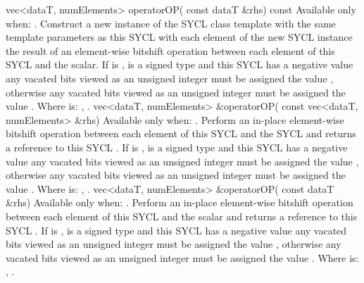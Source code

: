   \addRowTwoL
  {vec<dataT, numElements> operatorOP(}
  {  const dataT \&rhs) const}
  {
    Available only when: .
    \newline
    Construct a new instance of the SYCL  class template with the same template parameters as this SYCL  with each element of the new SYCL  instance the result of an element-wise  bitshift operation between each element of this SYCL  and the  scalar. If  is \codeinline{>>},  is a signed type and this SYCL  has a negative value any vacated bits viewed as an unsigned integer must be assigned the value , otherwise any vacated bits viewed as an unsigned integer must be assigned the value .
    \newline \newline
    Where  is: \codeinline{<<}, \codeinline{>>}.
  }
  \addRowTwoL
  {vec<dataT, numElements> \&operatorOP(}
  {  const vec<dataT, numElements> \&rhs)}
  {
    Available only when: .
    \newline
    Perform an in-place element-wise  bitshift operation between each element of this SYCL  and the  SYCL  and returns a reference to this SYCL . If  is \codeinline{>>\=},  is a signed type and this SYCL  has a negative value any vacated bits viewed as an unsigned integer must be assigned the value , otherwise any vacated bits viewed as an unsigned integer must be assigned the value .
    \newline \newline
    Where  is: \codeinline{<<\=}, \codeinline{>>\=}.
  }
  \addRowTwoL
  {vec<dataT, numElements> \&operatorOP(}
  {  const dataT \&rhs)}
  {
    Available only when: .
    \newline
    Perform an in-place element-wise  bitshift operation between each element of this SYCL  and the  scalar and returns a reference to this SYCL . If  is \codeinline{>>\=},  is a signed type and this SYCL  has a negative value any vacated bits viewed as an unsigned integer must be assigned the value , otherwise any vacated bits viewed as an unsigned integer must be assigned the value .
    \newline \newline
    Where  is: \codeinline{<<\=}, \codeinline{>>\=}.
  }
